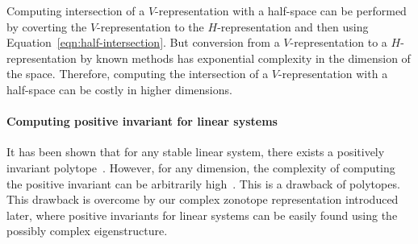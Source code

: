 Computing intersection of a $V$-representation with a half-space can
be performed by coverting the $V$-representation to the
$H$-representation and then using
Equation~\ref{eqn:half-intersection}.  But conversion from a
$V$-representation to a $H$-representation by known methods has
exponential complexity in the dimension of the space.  Therefore,
computing the intersection of a $V$-representation with a half-space
can be costly in higher dimensions.

\paragraph*{Computing positive invariant for linear systems}
It has been shown that for any stable linear system, there exists a
positively invariant polytope~\cite{todo}.  However, for any dimension, the
complexity of computing the positive invariant can be arbitrarily
high~\cite{todo}.  This is a drawback of polytopes.  This drawback is overcome by
our complex zonotope representation introduced later, where positive
invariants for linear systems can be easily found using the possibly
complex eigenstructure.
